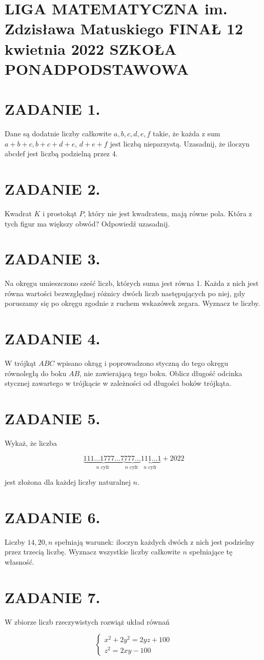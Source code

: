 \documentclass[10pt]{article}
\begin{document}
\section*{LIGA MATEMATYCZNA im. Zdzisława Matuskiego FINAŁ 12 kwietnia 2022 SZKOŁA PONADPODSTAWOWA}
\section*{ZADANIE 1.}
Dane są dodatnie liczby całkowite \(a, b, c, d, e, f\) takie, że każda z sum \(a+b+c, b+c+d+e\), \(d+e+f\) jest liczbą nieparzystą. Uzasadnij, że iloczyn abcdef jest liczbą podzielną przez 4.

\section*{ZADANIE 2.}
Kwadrat \(K\) i prostokąt \(P\), który nie jest kwadratem, mają równe pola. Która z tych figur ma większy obwód? Odpowiedź uzasadnij.

\section*{ZADANIE 3.}
Na okręgu umieszczono sześć liczb, których suma jest równa 1. Każda z nich jest równa wartości bezwzględnej różnicy dwóch liczb następujących po niej, gdy poruszamy się po okręgu zgodnie z ruchem wskazówek zegara. Wyznacz te liczby.

\section*{ZADANIE 4.}
W trójkąt \(A B C\) wpisano okrąg i poprowadzono styczną do tego okręgu równoległą do boku \(A B\), nie zawierającą tego boku. Oblicz długość odcinka stycznej zawartego w trójkącie w zależności od długości boków trójkąta.

\section*{ZADANIE 5.}
Wykaż, że liczba

\[
\underbrace{111 \ldots 1777 \ldots 7}_{n \text { cyfr }} \underbrace{777 \ldots}_{n \text { cyfr }} \underbrace{111 \ldots 1}_{n \text { cyfr }}+2022
\]

jest złożona dla każdej liczby naturalnej \(n\).

\section*{ZADANIE 6.}
Liczby \(14,20, n\) spełniają warunek: iloczyn każdych dwóch z nich jest podzielny przez trzecią liczbę. Wyznacz wszystkie liczby całkowite \(n\) spełniające tę własność.

\section*{ZADANIE 7.}
W zbiorze liczb rzeczywistych rozwiąż układ równań

\[
\left\{\begin{array}{l}
x^{2}+2 y^{2}=2 y z+100 \\
z^{2}=2 x y-100
\end{array}\right.
\]
\end{document}
